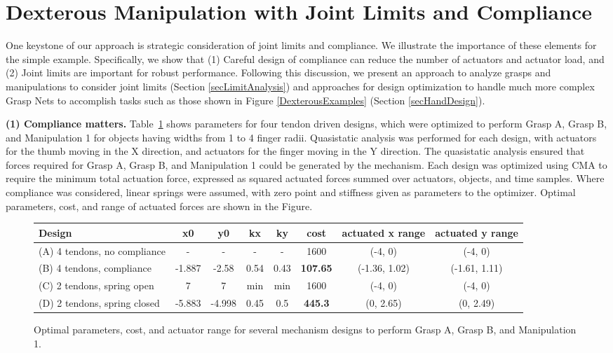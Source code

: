 \section{Dexterous Manipulation with Joint Limits and Compliance}
  \label{secManipAnalysis}



One keystone of our approach is strategic consideration of joint limits and compliance.  We illustrate the importance of these elements for the simple example.  Specifically, we show that (1) Careful design of compliance can reduce the number of actuators and actuator load, and (2) Joint limits are important for robust performance.   Following this discussion, we present an approach to analyze grasps and manipulations to consider joint limits (Section \ref{secLimitAnalysis}) and approaches for design optimization to handle much more complex Grasp Nets to accomplish tasks such as those shown in Figure \ref{DexterousExamples} (Section \ref{secHandDesign}).

\smallskip\noindent
{\bf (1) Compliance matters.}  Table~\ref{ComplianceAnalysis} shows parameters for four tendon driven designs, which were optimized to perform Grasp A, Grasp B, and Manipulation 1 for objects  having widths from 1 to 4 finger radii.   Quasistatic analysis was performed for each design, with actuators for the thumb moving in the X direction, and actuators for the finger moving in the Y direction.  The quasistatic analysis ensured that forces required for Grasp A, Grasp B, and Manipulation 1 could be generated by the mechanism.   Each design was optimized using CMA \cite{hansen2006cma} to require the minimum total actuation force, expressed as squared actuated forces summed over actuators, objects, and time samples.    Where compliance was considered, linear springs were assumed, with zero point and stiffness given as parameters to the optimizer.   Optimal parameters, cost, and range of actuated forces are shown in the Figure.

\begin{figure}
\begin{center}
\begin{tabular}{l|c|c|c|c|c|c|c|}
Design & x0 & y0 & kx & ky & cost &	actuated x range &	actuated y range \\ \hline
(A) 4 tendons, no compliance&	-&	-&	-&	-&	1600	&(-4, 0)	&(-4, 0)\\
(B) 4 tendons, compliance	&-1.887	&-2.58	&0.54&	0.43&	{\bf 107.65} &	(-1.36, 1.02)	&(-1.61, 1.11) \\
(C) 2 tendons, spring open&	7	&7	&min	&min	&1600	&(-4, 0)	&(-4, 0)\\
(D) 2 tendons, spring closed&	-5.883&	-4.998&	0.45&	0.5	& {\bf 445.3}  &	(0, 2.65)&	(0, 2.49)
\end{tabular}
\end{center}
\vspace*{-0.2in}
\caption{\small Optimal parameters, cost, and actuator range for several mechanism designs to perform Grasp A, Grasp B, and Manipulation 1.}
\label{ComplianceAnalysis}
\end{figure}

